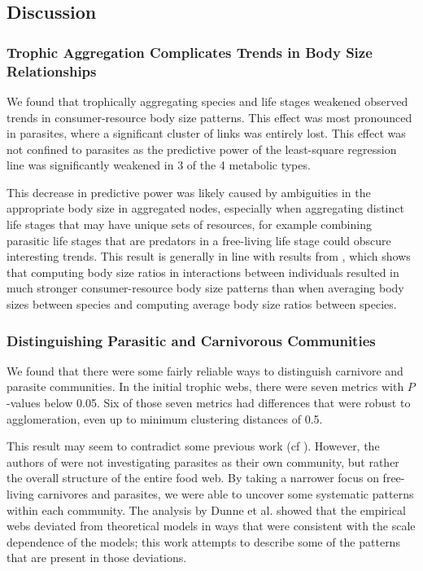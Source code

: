 \documentclass[/home/nkappler/Research/Dissertation/dissertation.tex]{subfiles}
\begin{document}
\begin{bibunit}
\section{Discussion} 

\subsubsection{Trophic Aggregation Complicates Trends in Body Size
Relationships} We found that trophically aggregating species and life stages
weakened observed trends in consumer-resource body size patterns. This effect
was most pronounced in parasites, where a significant cluster of links was
entirely lost. This effect was not confined to parasites as the predictive
power of the least-square regression line was significantly weakened in 3 of
the 4 metabolic types. 

This decrease in predictive power was likely caused by ambiguities in the
appropriate body size in aggregated nodes, especially when aggregating distinct
life stages that may have unique sets of resources, for example combining
parasitic life stages that are predators in a free-living life stage could
obscure interesting trends. This result is generally in line with results from
\cite*{Gilljam2012}, which shows that computing body size ratios in interactions
between individuals resulted in much stronger consumer-resource body size
patterns than when averaging body sizes between species and computing average
body size ratios between species. 

\subsubsection{Distinguishing Parasitic and Carnivorous Communities} We found
that there were some fairly reliable ways to distinguish carnivore and parasite
communities. In the initial trophic webs, there were seven metrics with
$P$-values below 0.05. Six of those seven metrics had differences that were
robust to agglomeration, even up to minimum clustering distances of 0.5.

This result may seem to contradict some previous work (cf \cite*{Dunne2013}).
However, the authors of \cite*{Dunne2013} were not investigating parasites as
their own community, but rather the overall structure of the entire food web.
By taking a narrower focus on free-living carnivores and parasites, we were
able to uncover some systematic patterns within each community. The analysis by
Dunne et al. showed that the empirical webs deviated from theoretical
models in ways that were consistent with the scale dependence of the models;
this work attempts to describe some of the patterns that are present in those
deviations. 


\end{bibunit}
\end{document}
